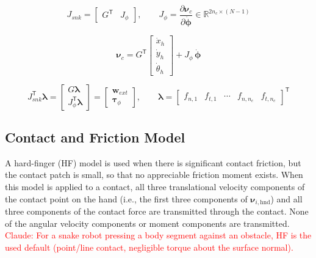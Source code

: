 \begin{equation}
  J_{snk} = \begin{bmatrix} G^\mathsf{T} & J_\phi \end{bmatrix},
  \qquad
  J_\phi = \frac{\partial \boldsymbol\nu_c}{\partial \dot{\boldsymbol\phi}} \in \mathbb R^{2n_c \times (N-1)}
  \label{eq:Jsnk-split}
\end{equation}
 
\begin{equation}
  \boldsymbol\nu_c = G^\mathsf{T}
  \begin{bmatrix} \dot x_h \\ \dot y_h \\ \dot\theta_h \end{bmatrix}
  + J_\phi\, \dot{\boldsymbol\phi}
  \label{eq:kinematics}
\end{equation}
 
\begin{equation}
  J_{snk}^\mathsf{T}\boldsymbol\lambda =
  \begin{bmatrix} G\boldsymbol\lambda \\ J_\phi^\mathsf{T}\boldsymbol\lambda \end{bmatrix}
  = \begin{bmatrix} \mathbf w_{ext} \\ \boldsymbol\tau_\phi \end{bmatrix},
  \qquad
  \boldsymbol\lambda = \begin{bmatrix} f_{n,1} & f_{t,1} & \cdots & f_{n,n_c} & f_{t,n_c} \end{bmatrix}^\mathsf{T}
  \label{eq:statics}
\end{equation}

\subsection{Contact and Friction Model}
\label{sec:contact-model}

A hard-finger (HF) model is used when there is significant contact friction,
but the contact patch is small, so that no appreciable friction moment
exists. When this model is applied to a contact, all three translational
velocity components of the contact point on the hand (i.e., the first three
components of $\boldsymbol{\nu}_{i,\mathrm{hnd}}$) and all three components of
the contact force are transmitted through the contact. None of the angular
velocity components or moment components are transmitted.
\textcolor{red}{Claude: For a snake robot pressing a body segment against an
obstacle, HF is the used default (point/line contact, negligible torque about
the surface normal).}

